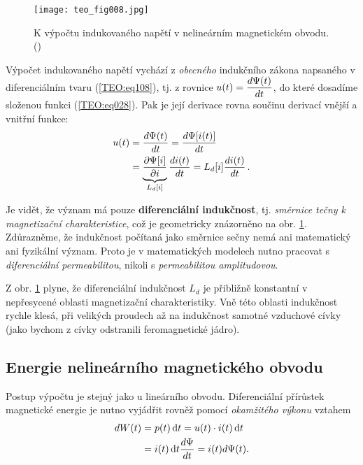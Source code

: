      \begin{figure}[ht!]  %
        \centering
        \texttt{[image: teo\_fig008.jpg]}
        \caption{K výpočtu indukovaného napětí v nelineárním magnetickém obvodu. 
                (\cite[s.~157]{Patocka4})}
        \label{teo:fig008}
      \end{figure}
      
      Výpočet indukovaného napětí vychází z \emph{obecného} indukčního zákona napsaného v 
      diferenciálním tvaru (\ref{TEO:eq108}), tj. z rovnice \(u(t) = \dfrac{d \Psi(t)}{d t}\), do 
      které dosadíme složenou funkci (\ref{TEO:eq028}). Pak je její derivace rovna součinu derivací 
      vnější a vnitřní funkce:
      \begin{align}\label{TEO:eq030}
        u(t) &= \dfrac{d \Psi(t)}{d t} = \dfrac{d \Psi[i(t)]}{d t}                \nonumber \\
             &= \underbrace{\dfrac{\partial \Psi[i]}{\partial i}}_{L_d[i]}\dfrac{d i(t)}{d t} 
              = L_d[i]\dfrac{d i(t)}{d t}\,.
      \end{align}
      
      Je vidět, že význam má pouze \textbf{diferenciální indukčnost}, tj. \emph{směrnice tečny k 
      magnetizační charakteristice}, což je geometricky znázorněno na obr. \ref{teo:fig008}. 
      Zdůrazněme, že indukčnost počítaná jako směrnice sečny nemá ani matematický ani fyzikální 
      význam. Proto je v matematických modelech nutno pracovat s \emph{diferenciální 
      permeabilitou}, nikoli s \emph{permeabilitou amplitudovou}.
      
      Z obr. \ref{teo:fig008} plyne, že diferenciální indukčnost \(L_d\) je přibližně konstantní v 
      nepřesycené oblasti magnetizační charakteristiky. Vně této oblasti indukčnost rychle klesá, 
      při velikých proudech až na indukčnost samotné vzduchové cívky (jako bychom z cívky 
      odstranili feromagnetické jádro).
      
    \subsection{Energie nelineárního magnetického obvodu}
      Postup výpočtu je stejný jako u lineárního obvodu. Diferenciální přírůstek magnetické energie 
      je nutno vyjádřit rovněž pomocí \emph{okamžitého výkonu} vztahem
      \begin{align}\label{TEO:eq031}
        dW(t) &= p(t)\mathop{}\!\mathrm{d}t = u(t)\cdot i(t)\mathop{}\!\mathrm{d}t         \nonumber \\
              &= i(t)\mathop{}\!\mathrm{d}t\dfrac{d \Psi}{d t} = i(t)d\Psi(t).
      \end{align}

